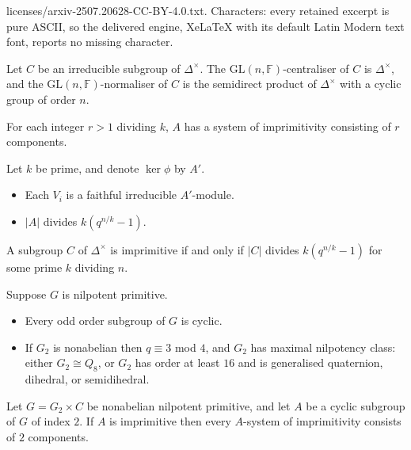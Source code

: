 \documentclass[10pt,a4paper]{amsart}
\begin{document}
licenses/arxiv-2507.20628-CC-BY-4.0.txt. Characters: every retained excerpt is pure ASCII, so the delivered engine, XeLaTeX with its default Latin Modern text font, reports no missing character.
\begin{proposition}
\label{normcentr}
 Let $C$ be an irreducible subgroup of $\Delta^{\! \times}$.
 The $\mathrm{GL}(n,\mathbb{F})$-centraliser of 
 $C$ is $\Delta^{\! \times}$, and the 
 $\mathrm{GL}(n,\mathbb{F})$-normaliser of 
 $C$ is the semidirect product of   
 $\Delta^{\! \times}$ with a cyclic group of order
 $n$.
\end{proposition}

\begin{lemma}
\label{sizeprim}
 For each integer $r>1$ dividing $k$, $A$  
 has a system of imprimitivity consisting of $r$
 components.
\end{lemma}

\begin{proposition}
\label{likesim}
 Let $k$ be prime, and denote $\ker \phi$ by $A'$.
\begin{itemize}
\item[{\rm (i)}]  Each $V_i$   
 is a faithful irreducible $A'$-module.
\item[{\rm (ii)}]  
 $|A|$ divides $k(q^{n/k}-1)$.
\end{itemize}
\end{proposition}

\begin{proposition}
\label{likersim}
 A subgroup $C$ of  $\Delta^{\! \times}$  is 
 imprimitive if and only if $|C|$ divides 
 $k(q^{n/k}-1)$ for some prime $k$ dividing  $n$.
\end{proposition}

\begin{theorem}
\label{konzal}
 Suppose $G$ is nilpotent primitive.  
\begin{itemize}
\item[{\rm (i)}] Every odd order subgroup of $G$ is cyclic.
\item[{\rm (ii)}] If $G_2$ is nonabelian then 
 $q\equiv 3$ mod $4$, and $G_2$ has maximal nilpotency 
 class: either $G_2 \cong Q_8$,
 or $G_2$ has order at least $16$ 
 and is generalised quaternion, 
 dihedral, or semidihedral. 
\end{itemize}
\end{theorem}

\begin{theorem}
\label{evenimprim}
 Let $G= G_2 \times C$ be nonabelian nilpotent primitive, 
 and let $A$ be a cyclic subgroup of $G$ of index $2$.
 If $A$ is imprimitive then every $A$-system of  
 imprimitivity consists of $2$ components. 
\end{theorem}
\end{document}
